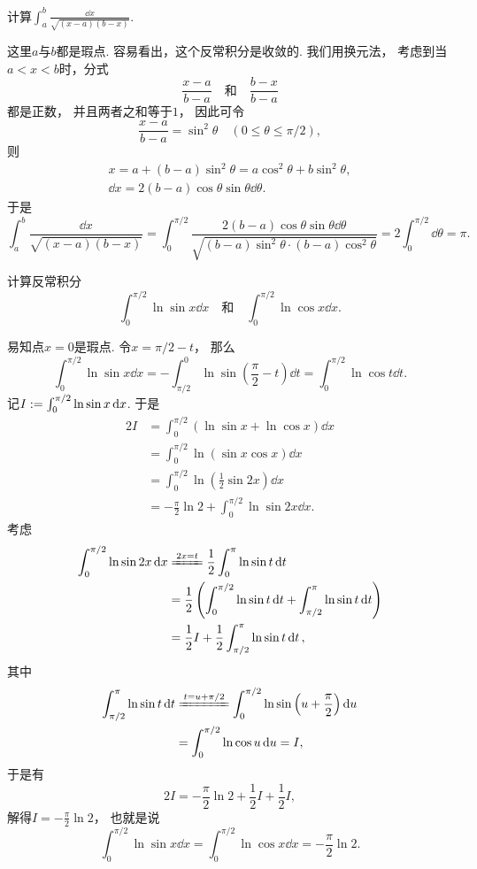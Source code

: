 \begin{example}
计算\(\int_a^b \frac{\dd{x}}{\sqrt{(x-a)(b-x)}}\).
\begin{solution}
这里\(a\)与\(b\)都是瑕点.
容易看出，这个反常积分是收敛的.
我们用换元法，
考虑到当\(a<x<b\)时，分式\[
	\frac{x-a}{b-a}
	\quad\text{和}\quad
	\frac{b-x}{b-a}
\]都是正数，
并且两者之和等于\(1\)，
因此可令\[
	\frac{x-a}{b-a} = \sin^2\theta
	\quad(0\leq\theta\leq\pi/2),
\]
则\begin{gather*}
	x = a + (b-a) \sin^2\theta
	= a \cos^2\theta + b \sin^2\theta, \\
	\dd{x} = 2(b-a) \cos\theta \sin\theta \dd{\theta}.
\end{gather*}
于是\[
	\int_a^b \frac{\dd{x}}{\sqrt{(x-a)(b-x)}}
	= \int_0^{\pi/2} \frac{2(b-a) \cos\theta \sin\theta \dd{\theta}}
		{\sqrt{(b-a) \sin^2\theta \cdot (b-a) \cos^2\theta}}
	= 2 \int_0^{\pi/2} \dd{\theta}
	= \pi.
\]
\end{solution}
\end{example}

\begin{example}
计算反常积分\[
	\int_0^{\pi/2} \ln\sin x \dd{x}
	\quad\text{和}\quad
	\int_0^{\pi/2} \ln\cos x \dd{x}.
\]
\begin{solution}
易知点\(x=0\)是瑕点.
令\(x=\pi/2-t\)，
那么\[
	\int_0^{\pi/2} \ln\sin x \dd{x}
	= -\int_{\pi/2}^0 \ln\sin\left(\frac\pi2-t\right) \dd{t}
	= \int_0^{\pi/2} \ln\cos t \dd{t}.
\]
记\(I := \int_0^{\pi/2} \ln\sin x \dd{x}\).
于是\begin{align*}
	2I &= \int_0^{\pi/2} (\ln\sin x + \ln\cos x) \dd{x} \\
	&= \int_0^{\pi/2} \ln(\sin x \cos x) \dd{x} \\
	&= \int_0^{\pi/2} \ln\left(\frac12 \sin2x\right) \dd{x} \\
	&= -\frac\pi2 \ln2 + \int_0^{\pi/2} \ln\sin2x \dd{x}.
\end{align*}
考虑\begin{align*}
	\int_0^{\pi/2} \ln\sin2x \dd{x}
	&\xlongequal{2x=t}
	\frac12 \int_0^\pi \ln\sin t \dd{t} \\
	&= \frac12 \left(
		\int_0^{\pi/2} \ln\sin t \dd{t}
		+ \int_{\pi/2}^\pi \ln\sin t \dd{t}
	\right) \\
	&= \frac12 I + \frac12 \int_{\pi/2}^\pi \ln\sin t \dd{t},
\end{align*}
其中\begin{align*}
	\int_{\pi/2}^\pi \ln\sin t \dd{t}
	&\xlongequal{t=u+\pi/2}
	\int_0^{\pi/2} \ln\sin\left(u+\frac\pi2\right) \dd{u} \\
	&= \int_0^{\pi/2} \ln\cos u \dd{u}
	= I,
\end{align*}
于是有\[
	2I = -\frac\pi2 \ln2 + \frac12 I + \frac12 I,
\]
解得\(I = -\frac\pi2 \ln2\)，
也就是说\begin{equation}
	\int_0^{\pi/2} \ln\sin x \dd{x}
	= \int_0^{\pi/2} \ln\cos x \dd{x}
	= -\frac\pi2 \ln2.
\end{equation}
\end{solution}
\end{example}
